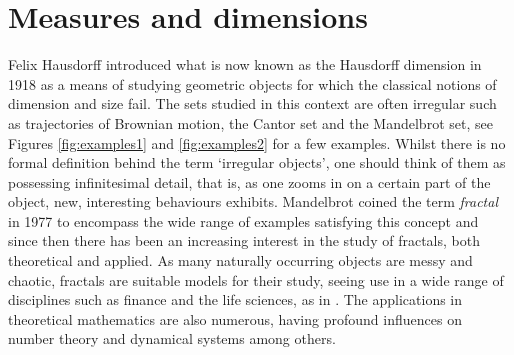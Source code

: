 \chapter{Measures and dimensions}
\label{chap:intro}



Felix Hausdorff introduced what is now known as the Hausdorff dimension in 1918 \cite{hausdorff} as a means of studying geometric objects for which the classical notions of dimension and size fail. The sets studied in this context are often irregular such as trajectories of Brownian motion, the Cantor set and the Mandelbrot set, see Figures \ref{fig:examples1} and \ref{fig:examples2} for a few examples. Whilst there is no formal definition behind the term `irregular objects', one should think of them as possessing infinitesimal detail, that is, as one zooms in on a certain part of the object, new, interesting behaviours exhibits. Mandelbrot \cite{mandelbrot} coined the term \textit{fractal} in 1977 to encompass the wide range of examples satisfying this concept and since then there has been an increasing interest in the study of fractals, both theoretical and applied. As many naturally occurring objects are messy and chaotic, fractals are suitable models for their study, seeing use in a wide range of disciplines such as finance and the life sciences, as in \cite{diieva, diieva2}. The applications in theoretical mathematics are also numerous, having profound influences on number theory and dynamical systems among others. 


